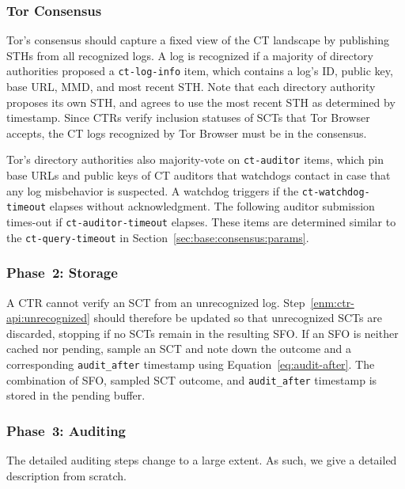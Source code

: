 \subsubsection{Tor Consensus}
Tor's consensus should capture a fixed view of the CT landscape by publishing
STHs from all recognized logs.  A log is recognized if a majority of directory
authorities proposed a \texttt{ct-log-info} item, which contains a log's ID,
public key, base URL, MMD, and most recent STH.  Note that each directory
authority proposes its own STH, and agrees to use the most recent STH as
determined by timestamp.  Since CTRs verify inclusion statuses of SCTs
that Tor Browser accepts, the CT logs recognized by Tor Browser must be in
the consensus.

Tor's directory authorities also majority-vote on \texttt{ct-auditor} items,
which pin base URLs and public keys of CT auditors that watchdogs contact in
case that any log misbehavior is suspected.  A watchdog triggers if the
\texttt{ct-watchdog-timeout} elapses without acknowledgment.  The following
auditor submission times-out if \texttt{ct-auditor-timeout} elapses.  These
items are determined similar to the \texttt{ct-query-timeout} in
Section~\ref{sec:base:consensus:params}.

\subsubsection{Phase~2: Storage}
A CTR cannot verify an SCT from an unrecognized log.
Step~\ref{enm:ctr-api:unrecognized} should therefore be updated so that
unrecognized SCTs are discarded, stopping if no SCTs remain in the resulting
SFO.  If an SFO is neither cached nor pending, sample an SCT and note down the
outcome and a corresponding \texttt{audit\_after} timestamp using
Equation~\ref{eq:audit-after}.  The combination of SFO, sampled SCT outcome, and
\texttt{audit\_after} timestamp is stored in the pending buffer.

\subsubsection{Phase~3: Auditing}
The detailed auditing steps change to a large extent.  As such, we give a
detailed description from scratch.

